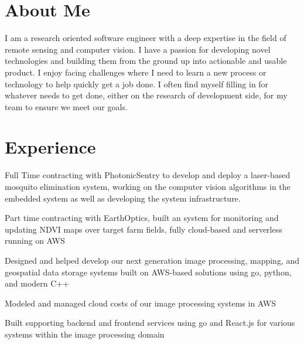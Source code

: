 \documentclass[]{nilosek-resume}
\begin{document}
\begin{minipage}[t]{0.7\textwidth} 


\section{About Me}
I am a research oriented software engineer with a deep expertise in the field of remote sensing and computer vision. I have a passion for developing novel technologies and building them from the ground up into actionable and usable product. I enjoy facing challenges where I need to learn a new process or technology to help quickly get a job done. I often find myself filling in for whatever needs to get done, either on the research of development side, for my team to ensure we meet our goals.


\section{Experience}
\vspace{\topsep} %
\begin{tightemize}
	\item Full Time contracting with PhotonicSentry to develop and deploy a laser-based mosquito elimination system, working on the computer vision algorithms in the embedded system as well as developing the system infrastructure.
	\item Part time contracting with EarthOptics, built an system for monitoring and updating NDVI maps over target farm fields, fully cloud-based and serverless running on AWS
\end{tightemize}
\sectionsep

\vspace{\topsep} %
\begin{tightemize}
	\item Designed and helped develop our next generation image processing, mapping, and geospatial data storage systems built on AWS-based solutions using go, python, and modern C++
	\item Modeled and managed cloud costs of our image processing systems in AWS
	\item Built supporting backend and frontend services using go and React.js for various systems within the image processing domain
\end{tightemize}
\sectionsep


\end{minipage}
\end{document}
